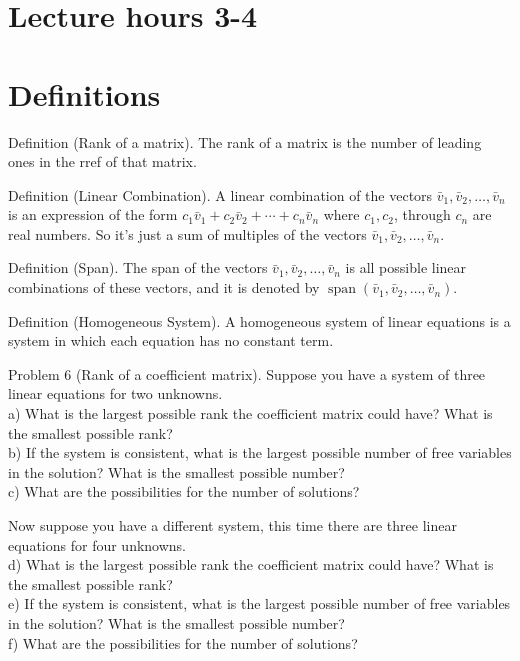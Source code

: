 \documentclass[10pt]{article}
\begin{document}
\section*{Lecture hours 3-4}
\section*{Definitions}
Definition (Rank of a matrix). The rank of a matrix is the number of leading ones in the rref of that matrix.

Definition (Linear Combination). A linear combination of the vectors $\bar{v}_{1}, \bar{v}_{2}, \ldots, \bar{v}_{n}$ is an expression of the form $c_{1} \bar{v}_{1}+c_{2} \bar{v}_{2}+\cdots+c_{n} \bar{v}_{n}$ where $c_{1}, c_{2}$, through $c_{n}$ are real numbers. So it's just a sum of multiples of the vectors $\bar{v}_{1}, \bar{v}_{2}, \ldots, \bar{v}_{n}$.

Definition (Span). The span of the vectors $\bar{v}_{1}, \bar{v}_{2}, \ldots, \bar{v}_{n}$ is all possible linear combinations of these vectors, and it is denoted by $\operatorname{span}\left(\bar{v}_{1}, \bar{v}_{2}, \ldots, \bar{v}_{n}\right)$.

Definition (Homogeneous System). A homogeneous system of linear equations is a system in which each equation has no constant term.

Problem 6 (Rank of a coefficient matrix). Suppose you have a system of three linear equations for two unknowns.\\
a) What is the largest possible rank the coefficient matrix could have? What is the smallest possible rank?\\
b) If the system is consistent, what is the largest possible number of free variables in the solution? What is the smallest possible number?\\
c) What are the possibilities for the number of solutions?

Now suppose you have a different system, this time there are three linear equations for four unknowns.\\
d) What is the largest possible rank the coefficient matrix could have? What is the smallest possible rank?\\
e) If the system is consistent, what is the largest possible number of free variables in the solution? What is the smallest possible number?\\
f) What are the possibilities for the number of solutions?
\end{document}
